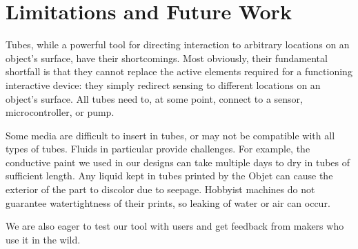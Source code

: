 \section{Limitations and Future Work}
Tubes, while a powerful tool for directing interaction to arbitrary locations on an object's surface, have their shortcomings.  Most obviously, their fundamental shortfall is that they cannot replace the active elements required for a functioning interactive device: they simply redirect sensing to different locations on an object's surface.  All tubes need to, at some point, connect to a sensor, microcontroller, or pump.

Some media are difficult to insert in tubes, or may not be compatible with all types of tubes.  Fluids in particular provide challenges.  For example, the conductive paint we used in our designs can take multiple days to dry in tubes of sufficient length.  Any liquid kept in tubes printed by the Objet can cause the exterior of the part to discolor due to seepage.  Hobbyist machines do not guarantee watertightness of their prints, so leaking of water or air can occur.


We are also eager to test our tool with users and get feedback from makers who use it in the wild.